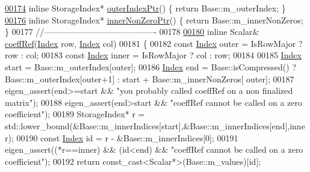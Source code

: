 \begin{DoxyCode}
\hyperlink{group___sparse_core___module_a3b74af754254837fc591cd9936688b95}{00174}     \textcolor{keyword}{inline} StorageIndex* \hyperlink{group___sparse_core___module_a3b74af754254837fc591cd9936688b95}{outerIndexPtr}()   \{ \textcolor{keywordflow}{return} Base::m\_outerIndex; \}
\hyperlink{group___sparse_core___module_af877ea4e285a4497f80987fea66f7459}{00176}     \textcolor{keyword}{inline} StorageIndex* \hyperlink{group___sparse_core___module_af877ea4e285a4497f80987fea66f7459}{innerNonZeroPtr}() \{ \textcolor{keywordflow}{return} Base::m\_innerNonZeros; \}
00177     \textcolor{comment}{//----------------------------------------}
00178 
\hyperlink{group___sparse_core___module_aa9c42d48b9dd6f947ce3c257fe4bf2ca}{00180}     \textcolor{keyword}{inline} Scalar& \hyperlink{group___sparse_core___module_aa9c42d48b9dd6f947ce3c257fe4bf2ca}{coeffRef}(\hyperlink{group___core___module_a554f30542cc2316add4b1ea0a492ff02}{Index} row, \hyperlink{group___core___module_a554f30542cc2316add4b1ea0a492ff02}{Index} col)
00181     \{
00182       \textcolor{keyword}{const} \hyperlink{group___core___module_a554f30542cc2316add4b1ea0a492ff02}{Index} outer = IsRowMajor ? row : col;
00183       \textcolor{keyword}{const} \hyperlink{group___core___module_a554f30542cc2316add4b1ea0a492ff02}{Index} inner = IsRowMajor ? col : row;
00184 
00185       \hyperlink{group___core___module_a554f30542cc2316add4b1ea0a492ff02}{Index} start = Base::m\_outerIndex[outer];
00186       \hyperlink{group___core___module_a554f30542cc2316add4b1ea0a492ff02}{Index} end = Base::isCompressed() ? Base::m\_outerIndex[outer+1] : start + Base::m\_innerNonZeros[
      outer];
00187       eigen\_assert(end>=start && \textcolor{stringliteral}{"you probably called coeffRef on a non finalized matrix"});
00188       eigen\_assert(end>start && \textcolor{stringliteral}{"coeffRef cannot be called on a zero coefficient"});
00189       StorageIndex* r = std::lower\_bound(&Base::m\_innerIndices[start],&Base::m\_innerIndices[end],inner);
00190       \textcolor{keyword}{const} \hyperlink{group___core___module_a554f30542cc2316add4b1ea0a492ff02}{Index} \textcolor{keywordtype}{id} = r - &Base::m\_innerIndices[0];
00191       eigen\_assert((*r==inner) && (\textcolor{keywordtype}{id}<end) && \textcolor{stringliteral}{"coeffRef cannot be called on a zero coefficient"});
00192       \textcolor{keywordflow}{return} \textcolor{keyword}{const\_cast<}Scalar*\textcolor{keyword}{>}(Base::m\_values)[\textcolor{keywordtype}{id}];

\end{DoxyCode}
